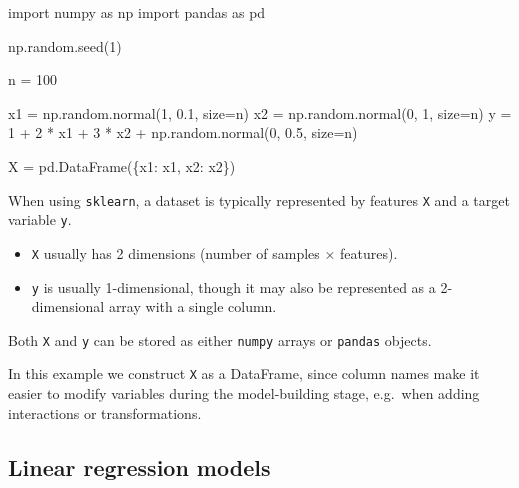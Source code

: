 \documentclass[
  letterpaper,
  DIV=11,
  numbers=noendperiod]{scrreprt}
\newenvironment{Shaded}{\begin{snugshade}}{\end{snugshade}}
\newcommand{\DecValTok}[1]{\textcolor[rgb]{0.68,0.00,0.00}{#1}}
\newcommand{\FloatTok}[1]{\textcolor[rgb]{0.68,0.00,0.00}{#1}}
\newcommand{\ImportTok}[1]{\textcolor[rgb]{0.00,0.46,0.62}{#1}}
\newcommand{\NormalTok}[1]{\textcolor[rgb]{0.00,0.23,0.31}{#1}}
\newcommand{\OperatorTok}[1]{\textcolor[rgb]{0.37,0.37,0.37}{#1}}
\newcommand{\StringTok}[1]{\textcolor[rgb]{0.13,0.47,0.30}{#1}}
\providecommand{\tightlist}{%
  \setlength{\itemsep}{0pt}\setlength{\parskip}{0pt}}
\theoremstyle{definition}
\theoremstyle{definition}
\theoremstyle{plain}
\theoremstyle{plain}
\theoremstyle{remark}
\begin{document}
\begin{Shaded}
\begin{Highlighting}[]
\ImportTok{import}\NormalTok{ numpy }\ImportTok{as}\NormalTok{ np}
\ImportTok{import}\NormalTok{ pandas }\ImportTok{as}\NormalTok{ pd}

\NormalTok{np.random.seed(}\DecValTok{1}\NormalTok{)}

\NormalTok{n }\OperatorTok{=} \DecValTok{100}

\NormalTok{x1 }\OperatorTok{=}\NormalTok{ np.random.normal(}\DecValTok{1}\NormalTok{, }\FloatTok{0.1}\NormalTok{, size}\OperatorTok{=}\NormalTok{n)}
\NormalTok{x2 }\OperatorTok{=}\NormalTok{ np.random.normal(}\DecValTok{0}\NormalTok{, }\DecValTok{1}\NormalTok{, size}\OperatorTok{=}\NormalTok{n)}
\NormalTok{y }\OperatorTok{=} \DecValTok{1} \OperatorTok{+} \DecValTok{2} \OperatorTok{*}\NormalTok{ x1 }\OperatorTok{+} \DecValTok{3} \OperatorTok{*}\NormalTok{ x2 }\OperatorTok{+}\NormalTok{ np.random.normal(}\DecValTok{0}\NormalTok{, }\FloatTok{0.5}\NormalTok{, size}\OperatorTok{=}\NormalTok{n)}

\NormalTok{X }\OperatorTok{=}\NormalTok{ pd.DataFrame(\{}\StringTok{\textquotesingle{}x1\textquotesingle{}}\NormalTok{: x1, }\StringTok{\textquotesingle{}x2\textquotesingle{}}\NormalTok{: x2\})}
\end{Highlighting}
\end{Shaded}

When using \texttt{sklearn}, a dataset is typically represented by
features \texttt{X} and a target variable \texttt{y}.

\begin{itemize}
\tightlist
\item
  \texttt{X} usually has 2 dimensions (number of samples × features).
\item
  \texttt{y} is usually 1-dimensional, though it may also be represented
  as a 2-dimensional array with a single column.
\end{itemize}

Both \texttt{X} and \texttt{y} can be stored as either \texttt{numpy}
arrays or \texttt{pandas} objects.

In this example we construct \texttt{X} as a DataFrame, since column
names make it easier to modify variables during the model-building
stage, e.g.~when adding interactions or transformations.

\subsection{Linear regression models}\label{linear-regression-models}
\end{document}
